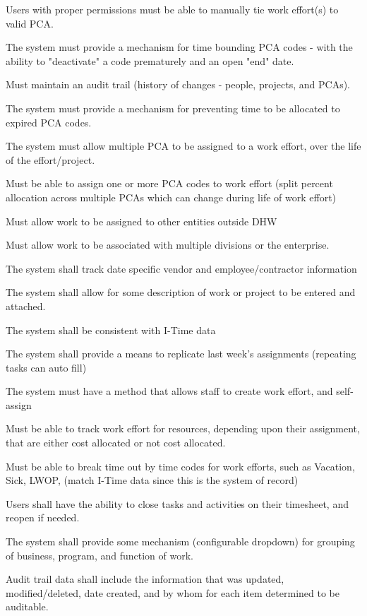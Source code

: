 \documentclass[letterpaper]{article}
\begin{document}
Users with proper permissions must be able to manually tie work effort(s) to valid PCA.

The system must provide a mechanism for time bounding PCA codes - with the ability to "deactivate" a code prematurely and an open "end" date.

Must maintain an audit trail (history of changes - people, projects, and PCAs).

The system must provide a mechanism for preventing time to be allocated to expired PCA codes.

The system must allow multiple PCA to be assigned to a work effort, over the life of the effort/project.

Must be able to assign one or more PCA codes to work effort (split percent allocation across multiple PCAs which can change during life of work effort)

Must allow work to be assigned to other entities outside DHW

Must allow work to be associated with multiple divisions or the enterprise.

The system shall track date specific vendor and employee/contractor information

The system shall allow for some description of work or project to be entered and attached.

The system shall be consistent with I-Time data

The system shall provide a means to replicate last week's assignments (repeating tasks can auto fill)

The system must have a method that allows staff to create work effort, and self-assign

Must be able to track work effort for resources, depending upon their assignment, that are either cost allocated or not cost allocated.

Must be able to break time out by time codes for work efforts, such as Vacation, Sick, LWOP, (match I-Time data since this is the system of record)

Users shall have the ability to close tasks and activities on their timesheet, and reopen if needed.

The system shall provide some mechanism (configurable dropdown) for  grouping of business, program, and function of work.

Audit trail data shall include the information that was updated, modified/deleted, date created, and by whom for each item determined to be auditable.
\end{document}
